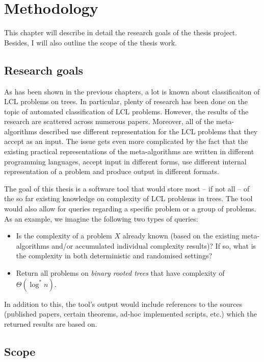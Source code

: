 \chapter{Methodology}
\label{chapter:methods}

This chapter will describe in detail the research goals of the thesis project. Besides, I will also outline the scope of the thesis work.

\section{Research goals}

As has been shown in the previous chapters, a lot is known about classificaiton
of LCL problems on trees. In particular, plenty of research has been done
on the topic of automated classification of LCL problems. However, the
results of the research are scattered across numerous papers. Moreover,
all of the meta-algorithms described use different representation for
the LCL problems that they accept as an input.
The issue gets even more complicated by the fact that the existing practical representations
of the meta-algorithms are written in different programming languages, accept input in
different forms,
use different internal representation of a problem and produce output in different
formats.

The goal of this thesis is a software tool that would store most -- if not all -- of
the so far existing knowledge on complexity of LCL problems in trees.
The tool would also allow for queries regarding a specific problem or a group of
problems. As an example, we imagine the following two types of queries:
\begin{itemize}
  \item Is the complexity of a problem $X$ already known (based on the existing meta-algorithms
  and/or accumulated individual complexity results)? If so, what is the complexity in both
  deterministic and randomised settings?
  \item Return all problems on \emph{binary rooted trees} that have complexity of
  $\Theta(\log^* n)$.
\end{itemize}
In addition to this, the tool’s output would include references to
the sources
(published papers, certain theorems, ad-hoc implemented scripts, etc.)
which the returned results are based on.

\section{Scope}

